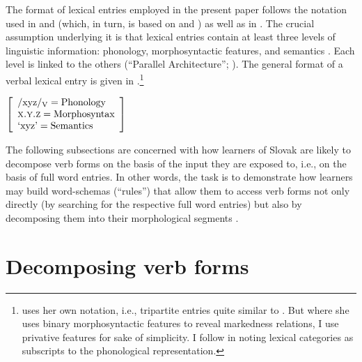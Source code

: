\documentclass[output=paper,colorlinks,citecolor=brown]{langscibook}
\begin{document}
The format of lexical entries employed in the present paper follows the notation used in \citet{Haspelmath2002} and \citet{HaspelmathSims2010} (which, in turn, is based on \citealt{Becker1990,Becker1993a,Becker1993b} and \citealt{Bochner1993}) as well as in \citet{Jackendoff.Audring2016,Jackendoff.Audring2018}. The crucial assumption underlying it is that lexical entries contain at least three levels of linguistic information: phonology, morphosyntactic features, and semantics \citep[similar assumptions are made by Manfred Bierwisch, e.g.,][]{Bierwisch1983,Bierwisch1997,Bierwisch2007}. Each level is linked to the others (``Parallel Architecture''; \citealt{Jackendoff2002,Jackendoff2007,Jackendoff2010,Culicover.Jackendoff2005}). The general format of a verbal lexical entry is given in .\footnote{\citet{Zimmermann2019} uses her own notation, i.e., tripartite entries quite similar to . But where she uses binary morphosyntactic features to reveal markedness relations, I use privative features for sake of simplicity. I follow \citet{HaspelmathSims2010} in noting lexical categories as subscripts to the phonological representation.}

\ea\label{ex:GeneralFormat}
$\left[
\begin{array}{l}
    \text{/xyz/\textsubscript{V}} = \text{Phonology} \\
    \textsc{x.y.z} = \text{Morphosyntax} \\
    \text{`xyz'} = \text{Semantics}
\end{array}
\right] $  \hfill \citep[cf.][48--49]{Haspelmath2002}
\z

\noindent The following subsections are concerned with how learners of Slovak are likely to decompose verb forms on the basis of the input they are exposed to, i.e., on the basis of full word entries. In other words, the task is to demonstrate how learners may build word-schemas (``rules'') that allow them to access verb forms not only directly (by searching for the respective full word entries) but also by decomposing them into their morphological segments \citep[see][72--74]{HaspelmathSims2010}.


\section{Decomposing verb forms}\label{sec:Decomposing}
\end{document}
